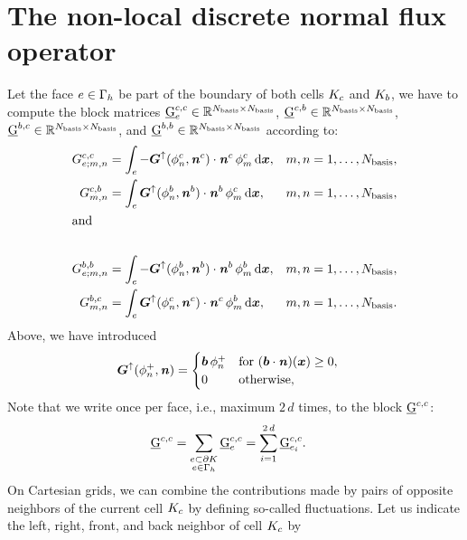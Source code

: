\documentclass{scrreprt}
\begin{document}
\section{The non-local discrete normal flux operator}
Let the face $e \in \Gamma_h$ be part of the boundary of both
cells $K_c$ and $K_b$, we have to compute the block matrices
$\underline{\mathrm{G}}_e^{c,c} \in \mathbb{R}^{N_\textup{basis} \times N_\textup{basis}}$,
$\underline{\mathrm{G}}^{c,b} \in \mathbb{R}^{N_\textup{basis} \times N_\textup{basis}}$,
$\underline{\mathrm{G}}^{b,c} \in \mathbb{R}^{N_\textup{basis} \times N_\textup{basis}}$,
and
$\underline{\mathrm{G}}^{b,b} \in \mathbb{R}^{N_\textup{basis} \times N_\textup{basis}}$
according to:
\begin{align}
{G}^{c,c}_{e;m,n} &=
\int_{e}
-
{\boldsymbol G}^{\uparrow}(\phi^{c}_{n},{\boldsymbol {\mathit{n}}}^{{c}})\cdot{\boldsymbol {\mathit{n}}}^{{c}}\,
\phi^{c}_{m} \, \text{d}{\boldsymbol x},
&& m,n = 1,\ldots,N_\textup{basis},
\\
{G}^{c,b}_{m,n} &=
\int_{e}
{\boldsymbol G}^{\uparrow}(\phi^{b}_{n},{\boldsymbol {\mathit{n}}}^{{b}})\cdot{\boldsymbol {\mathit{n}}}^{{b}}\,
\phi^{c}_{m} \, \text{d}{\boldsymbol x},
&& m,n = 1,\ldots,N_\textup{basis},
\\
\intertext{and}
\\
{G}^{b,b}_{e;m,n} &=
\int_{e}
-
{\boldsymbol G}^{\uparrow}(\phi^{b}_{n},{\boldsymbol {\mathit{n}}}^{{b}})
\cdot {\boldsymbol {\mathit{n}}}^{{b}}
\,
\phi^{b}_{m} \, \text{d}{\boldsymbol x},
&& m,n = 1,\ldots,N_\textup{basis},
\\
{G}^{b,c}_{m,n} &=
\int_{e}
{\boldsymbol G}^{\uparrow}(\phi^{c}_{n},{\boldsymbol {\mathit{n}}}^{{c}})
\cdot {\boldsymbol {\mathit{n}}}^{{c}}
\,\phi^{b}_{m} \, \text{d}{\boldsymbol x},
&& m,n = 1,\ldots,N_\textup{basis}.
\end{align}
Above, we have introduced
\begin{align}
{\boldsymbol G}^{\uparrow}(\phi^{+}_{n},{\boldsymbol {\mathit{n}}})
&=
\begin{cases}
{\boldsymbol b}\,\phi^{+}_{n}
& \textup{for }
({\boldsymbol b} \cdot {\boldsymbol {\mathit{n}}})({\boldsymbol x}) \geq 0,
\\
0                & \textup{otherwise},
\end{cases}
\end{align}
Note that we write once per face, i.e., maximum  $2\,d$ times, to the block
$\underline{\mathrm{G}}^{c,c}$:
\begin{align}
\underline{\mathrm{G}}^{c,c} &= \sum_{\substack{e\subset{\partial K} \\
e\in\Gamma_h}}\underline{\mathrm{G}}^{c,c}_{e} =
\sum_{i=1}^{2\,d}\underline{\mathrm{G}}^{c,c}_{e_i}.
\end{align}
On Cartesian grids, we can combine the contributions made by pairs of opposite
neighbors of the current cell $K_c$ by defining so-called fluctuations.
Let us indicate the left, right, front, and back neighbor of cell $K_c$ by
\end{document}

